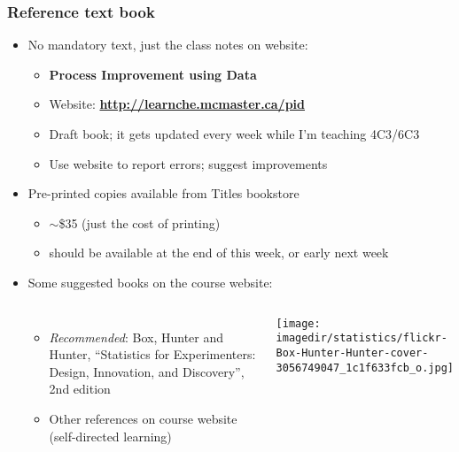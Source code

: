 \begin{frame}\frametitle{Reference text book}
	\begin{itemize}
		\item	No mandatory text, just the class notes on website: 
		\begin{itemize}
			\item	\textbf{Process Improvement using Data} 
			\item	Website: \textbf{\href{http://learnche.mcmaster.ca/pid?source=4C3-admin-notes}{http://learnche.mcmaster.ca/pid}} 
			\item	Draft book; it gets updated every week while I'm teaching 4C3/6C3
			\item	Use website to report errors; suggest improvements 
		\end{itemize}
	\end{itemize}
	\begin{itemize}
		\item	Pre-printed copies available from Titles bookstore 
		\begin{itemize}
			\item	$\sim$\$35 (just the cost of printing) 
			\item	should be available at the end of this week, or early next week
		\end{itemize}
	\end{itemize}
	\begin{itemize}
		\item	Some suggested books on the course website: 
		\begin{columns}[t]
				\begin{itemize}
					\item	\emph{Recommended}: Box, Hunter and Hunter, ``Statistics for Experimenters: Design, Innovation, and Discovery'', 2nd edition
					\item	Other references on course website (self-directed learning)
				\end{itemize}
				\vspace{-1cm}
				\begin{center}
					\texttt{[image: \\imagedir/statistics/flickr-Box-Hunter-Hunter-cover-3056749047\_1c1f633fcb\_o.jpg]}
				\end{center}
		\end{columns}
	\end{itemize}
\end{frame}

